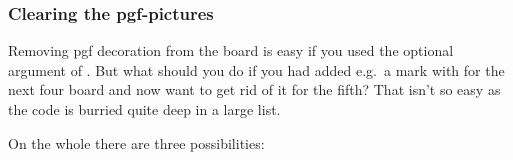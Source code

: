 \documentclass[pagesize,parskip=half-,fontsize=12pt]{scrartcl}
\begin{document}


%







\subsubsection{Clearing the pgf-pictures}




Removing pgf decoration from the board is easy if you used the
optional argument of . But what should you do if you
had added e.g.\ a mark with  for the next four
board and now want to get rid of it for the fifth? That isn't so easy
as the code is burried quite deep in a large list.

On the whole there are three possibilities:
\end{document}
